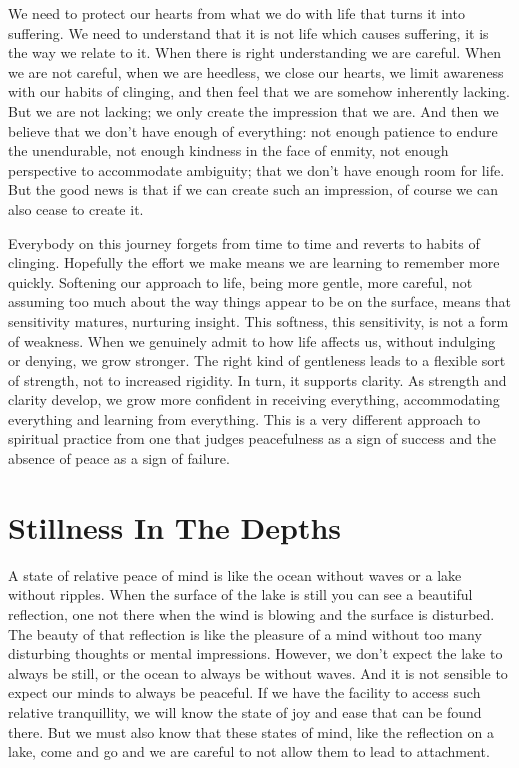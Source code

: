 We need to protect our hearts from what we do with life that turns it
into suffering. We need to understand that it is not life which causes
suffering, it is the way we relate to it. When there is right
understanding we are careful. When we are not careful, when we are
heedless, we close our hearts, we limit awareness with our habits of
clinging, and then feel that we are somehow inherently lacking. But we
are not lacking; we only create the impression that we are. And then we
believe that we don’t have enough of everything: not enough patience to
endure the unendurable, not enough kindness in the face of enmity, not
enough perspective to accommodate ambiguity; that we don’t have enough
room for life. But the good news is that if we can create such an
impression, of course we can also cease to create it.

Everybody on this journey forgets from time to time and reverts to
habits of clinging. Hopefully the effort we make means we are learning
to remember more quickly. Softening our approach to life, being more
gentle, more careful, not assuming too much about the way things appear
to be on the surface, means that sensitivity matures, nurturing insight.
This softness, this sensitivity, is not a form of weakness. When we
genuinely admit to how life affects us, without indulging or denying, we
grow stronger. The right kind of gentleness leads to a flexible sort of
strength, not to increased rigidity. In turn, it supports clarity. As
strength and clarity develop, we grow more confident in receiving
everything, accommodating everything and learning from everything. This
is a very different approach to spiritual practice from one that judges
peacefulness as a sign of success and the absence of peace as a sign of
failure.

\section{Stillness In The Depths}

A state of relative peace of mind is like the ocean without waves or a
lake without ripples. When the surface of the lake is still you can see
a beautiful reflection, one not there when the wind is blowing and the
surface is disturbed. The beauty of that reflection is like the pleasure
of a mind without too many disturbing thoughts or mental impressions.
However, we don’t expect the lake to always be still, or the ocean to
always be without waves. And it is not sensible to expect our minds to
always be peaceful. If we have the facility to access such relative
tranquillity, we will know the state of joy and ease that can be found
there. But we must also know that these states of mind, like the
reflection on a lake, come and go and we are careful to not allow them
to lead to attachment.

